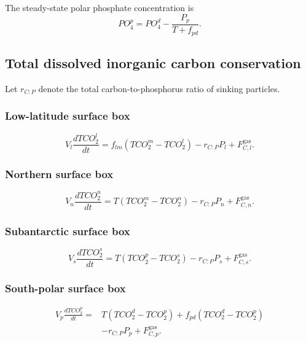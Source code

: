\documentclass[11pt]{article}
\begin{document}
The steady-state polar phosphate concentration is
\begin{equation}
PO_4^p
=
PO_4^d
-
\frac{P_p}{T+f_{pd}}.
\label{eq:six_po4_p_steady}
\end{equation}

\subsection{Total dissolved inorganic carbon conservation}

Let \(r_{C:P}\) denote the total carbon-to-phosphorus ratio
of sinking particles.

\subsubsection{Low-latitude surface box}

\begin{equation}
V_l\frac{dTCO_2^l}{dt}
=
f_{lm}\left(TCO_2^m-TCO_2^l\right)
-
r_{C:P}P_l
+
F^{\mathrm{gas}}_{C,l}.
\label{eq:six_tco2_l}
\end{equation}

\subsubsection{Northern surface box}

\begin{equation}
V_n\frac{dTCO_2^n}{dt}
=
T\left(TCO_2^m-TCO_2^n\right)
-
r_{C:P}P_n
+
F^{\mathrm{gas}}_{C,n}.
\label{eq:six_tco2_n}
\end{equation}

\subsubsection{Subantarctic surface box}

\begin{equation}
V_s\frac{dTCO_2^s}{dt}
=
T\left(TCO_2^p-TCO_2^s\right)
-
r_{C:P}P_s
+
F^{\mathrm{gas}}_{C,s}.
\label{eq:six_tco2_s}
\end{equation}

\subsubsection{South-polar surface box}

\begin{equation}
\begin{split}
V_p\frac{dTCO_2^p}{dt}
={}&
T\left(TCO_2^d-TCO_2^p\right)
+
f_{pd}\left(TCO_2^d-TCO_2^p\right)
\\
&-
r_{C:P}P_p
+
F^{\mathrm{gas}}_{C,p}.
\end{split}
\label{eq:six_tco2_p}
\end{equation}
\end{document}
